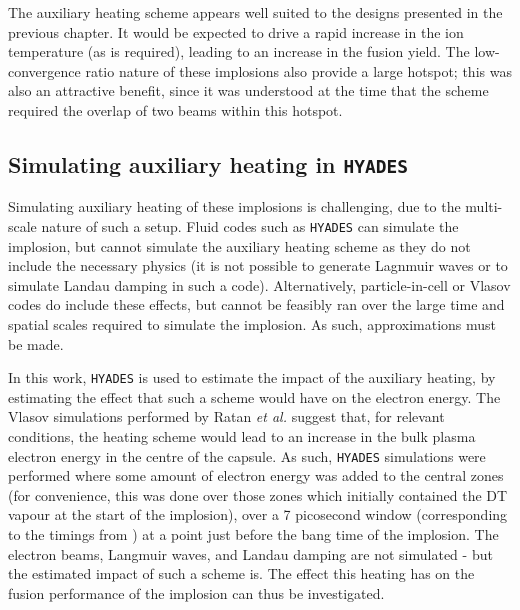 The auxiliary heating scheme appears well suited to the designs presented in the previous chapter. It would be expected to drive a rapid increase in the ion temperature (as is required), leading to an increase in the fusion yield. The low-convergence ratio nature of these implosions also provide a large hotspot; this was also an attractive benefit, since it was understood at the time that the scheme required the overlap of two beams within this hotspot. 


\subsection{Simulating auxiliary heating in \texttt{HYADES}}

Simulating auxiliary heating of these implosions is challenging, due to the multi-scale nature of such a setup. Fluid codes such as \texttt{HYADES} can simulate the implosion, but cannot simulate the auxiliary heating scheme as they do not include the necessary physics (it is not possible to generate Lagnmuir waves or to simulate Landau damping in such a code). Alternatively, particle-in-cell or Vlasov codes do include these effects, but cannot be feasibly ran over the large time and spatial scales required to simulate the implosion. As such, approximations must be made.

In this work, \texttt{HYADES} is used to estimate the impact of the auxiliary heating, by estimating the effect that such a scheme would have on the electron energy. The Vlasov simulations performed by Ratan \textit{et al.} suggest that, for relevant conditions, the heating scheme would lead to an increase in the bulk plasma electron energy in the centre of the capsule. As such, \texttt{HYADES} simulations were performed where some amount of electron energy was added to the central zones (for convenience, this was done over those zones which initially contained the DT vapour at the start of the implosion), over a 7 picosecond window (corresponding to the timings from \cite{Ratan2017}) at a point just before the bang time of the implosion. The electron beams, Langmuir waves, and Landau damping are not simulated - but the estimated impact of such a scheme is. The effect this heating has on the fusion performance of the implosion can thus be investigated.

